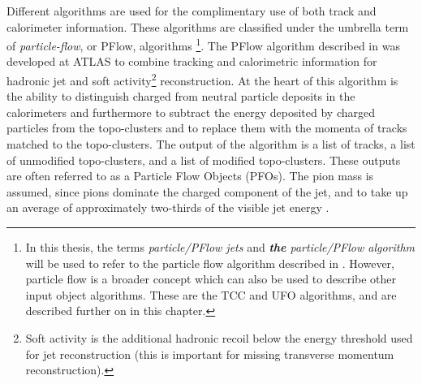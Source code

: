 %
Different algorithms are used for the complimentary use of both track and calorimeter information. These algorithms are classified under the umbrella term of \textit{particle-flow}, or PFlow, algorithms \cite{Atlas:PFlowOG}\footnote{In this thesis, the terms \textit{particle/PFlow jets} and \textit{\textbf{the} particle/PFlow algorithm} will be used to refer to the particle flow algorithm described in \cite{Atlas:PFlow}. However, particle flow is a broader concept which can also be used to describe other input object algorithms. These are the TCC and UFO algorithms, and are described further on in this chapter.}. The PFlow algorithm described in \cite{Atlas:PFlow} was developed at ATLAS to combine tracking and calorimetric information for hadronic jet and soft activity\footnote{Soft activity is the additional hadronic recoil below the energy threshold used for jet reconstruction (this is important for missing transverse momentum reconstruction).} reconstruction. At the heart of this algorithm is the ability to distinguish charged from neutral particle deposits in the calorimeters and furthermore to subtract the energy deposited by charged particles from the topo-clusters and to replace them with the momenta of tracks matched to the topo-clusters. The output of the algorithm is a list of tracks, a list of unmodified topo-clusters, and a list of modified topo-clusters. These outputs are often referred to as a Particle Flow Objects (PFOs). The pion mass is assumed, since pions dominate the charged component of the jet, and to take up an average of approximately two-thirds of the visible jet energy \cite{Atlas:PFlow,Atlas:jetconstituent1,Atlas:jetconstituent2}. %

